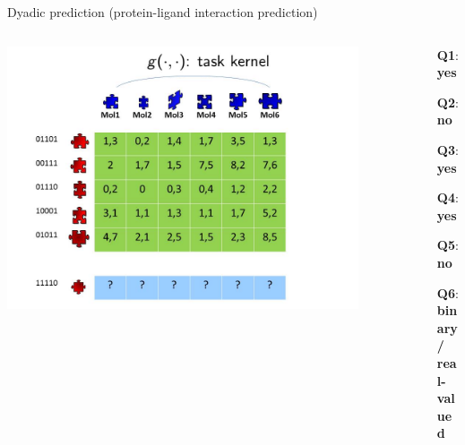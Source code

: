 \documentclass[]{beamer}
\begin{document}
\begin{frame}
{Dyadic prediction (protein-ligand interaction prediction)}

\begin{columns}

\begin{column}{9cm}
\includegraphics[width=0.9\textwidth,trim = 0 0 100 100,clip]{Figures/pictures/Slide4}
\end{column}

\begin{column}{7cm}
\begin{itemize}
\itemindent=2pt    \item [\textbf{Q1}:] \textbf{yes}
\itemindent=2pt    \item [\textbf{Q2}:] \textbf{no}
\itemindent=2pt    \item [\textbf{Q3}:] \textbf{yes}
\itemindent=2pt    \item [\textbf{Q4}:] \textbf{\color{red}yes}
\itemindent=2pt    \item [\textbf{Q5}:] \textbf{no}
\itemindent=2pt    \item [\textbf{Q6}:]  \textbf{binary/\\real-valued}
\end{itemize}
\end{column}

\end{columns}
\end{frame}
\end{document}
